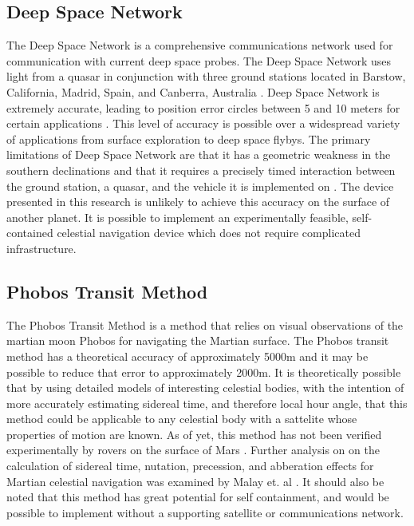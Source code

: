 \documentclass[12pt,a4paper]{book}
\begin{document}
\subsection*{Deep Space Network}
The Deep Space Network is a comprehensive communications network used for communication with current deep space probes.  The Deep Space Network uses light from a quasar in conjunction with three ground stations located in Barstow, California, Madrid, Spain, and Canberra, Australia \cite{b:dsn}.  Deep Space Network is extremely accurate, leading to position error circles between 5 and 10 meters for certain applications \cite{b:msla}.  This level of accuracy is possible over a widespread variety of applications from surface exploration to deep space flybys.  The primary limitations of Deep Space Network are that it has a geometric weakness in the southern declinations and that it requires a precisely timed interaction between the ground station, a quasar, and the vehicle it is implemented on \cite{b:dor}. The device presented in this research is unlikely to achieve this accuracy on the surface of another planet.  It is possible to implement an experimentally feasible, self-contained celestial navigation device which does not require complicated infrastructure.  
\subsection*{Phobos Transit Method}
The Phobos Transit Method is a method that relies on visual observations of the martian moon Phobos for navigating the Martian surface.  The Phobos transit method has a theoretical accuracy of approximately 5000m and it may be possible to reduce that error to approximately 2000m.  It is theoretically possible that by using detailed models of interesting celestial bodies, with the intention of more accurately estimating sidereal time, and therefore local hour angle, that this method could be applicable to any celestial body with a sattelite whose properties of motion are known.   As of yet, this method has not been verified experimentally by rovers on the surface of Mars   \cite{b:phobos}.  Further analysis on on the calculation of sidereal time, nutation, precession, and abberation effects for Martian celestial navigation was examined by Malay et. al  \cite{b:mars}.  It should also be noted that this method has great potential for self containment, and would be possible to implement without a supporting satellite or communications network. 
\end{document}

